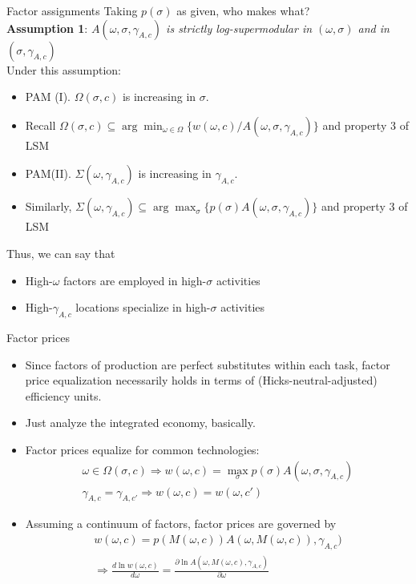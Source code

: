 \documentclass[10pt,notes=hide]{beamer}
\begin{document}
\begin{frame}{Factor assignments}
Taking $p(\sigma)$ as given, who makes what? \\
\textbf{Assumption 1}: 
\textit{$A(\omega,\sigma,\gamma_{A,c})$ is strictly log-supermodular in $(\omega,\sigma)$ and in $(\sigma,\gamma_{A,c})$} \\
Under this assumption:
\begin{itemize}
	\item PAM (I). $\Omega(\sigma,c)$ is increasing in $\sigma$.
	\item[] Recall $\Omega(\sigma,c) \subseteq \arg\min_{\omega\in\Omega} \{w(\omega,c) / A(\omega,\sigma,\gamma_{A,c}) \} $ and property 3 of LSM
	\item PAM(II). $\Sigma(\omega,\gamma_{A,c})$ is increasing in $\gamma_{A,c}$.
	\item[] Similarly, $\Sigma(\omega,\gamma_{A,c}) \subseteq \arg\max_\sigma \{p(\sigma)A(\omega,\sigma,\gamma_{A,c})\}$ and property 3 of LSM
\end{itemize}
Thus, we can say that
\begin{itemize}
	\item High-$\omega$ factors are employed in high-$\sigma$ activities
	\item High-$\gamma_{A,c}$ locations specialize in high-$\sigma$ activities
\end{itemize}
\end{frame}
\begin{frame}{Factor prices}
\begin{itemize}
	\item Since factors of production are perfect substitutes within each task,
factor price equalization necessarily holds in terms of (Hicks-neutral-adjusted) efficiency units.
\item Just analyze the integrated economy, basically.
\item Factor prices equalize for common technologies:
\begin{align*}
\omega \in \Omega(\sigma,c) \Rightarrow w(\omega,c) = \max_{\sigma} p(\sigma) A(\omega,\sigma,\gamma_{A,c}) \\
\gamma_{A,c} = \gamma_{A,c'} \Rightarrow w(\omega,c)=w(\omega,c')
\end{align*}
\item Assuming a continuum of factors, factor prices are governed by
\begin{align*}
w(\omega,c) = p(M(\omega,c))A(\omega,M(\omega,c)),\gamma_{A,c}) \\
\Rightarrow \frac{d \ln w(\omega,c)}{d\omega} = \frac{\partial \ln A(\omega,M(\omega,c),\gamma_{A,c})}{\partial \omega}
\end{align*}
\end{itemize}
\end{frame}
\end{document}
